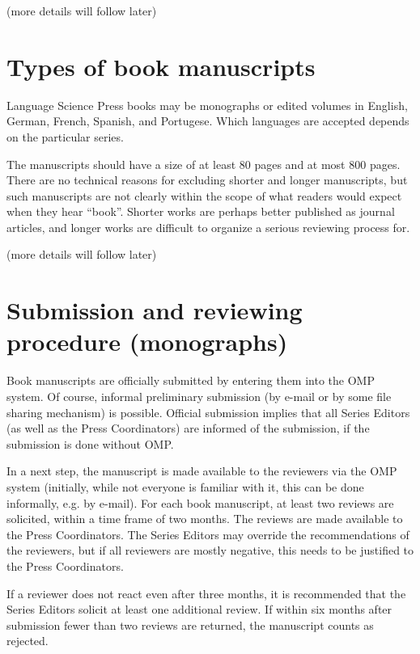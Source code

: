 \documentclass[ number=??
                ,series=lnls,
                ,isbn=000-0-000000-00-0,
                ,url=http://langsci-press.org/catalog/book/0,
	        ,output=long    %
	        ,draftmode  
		  ]{LSP/langsci}
\begin{document}
(more details will follow later)

\section{Types of book manuscripts}

Language Science Press books may be monographs or edited volumes in English, German, French, Spanish,
and Portugese. Which languages are accepted depends on the particular series.

The manuscripts should have a size of at least 80 pages and at most 800 pages.
There are no technical reasons for excluding shorter and longer manuscripts, but such manuscripts
are not clearly within the scope of what readers would expect when they hear ``book''. Shorter works
are perhaps better published as journal articles, and longer works are difficult to organize a
serious reviewing process for.

(more details will follow later)


\section{Submission and reviewing procedure (monographs)}

Book manuscripts are officially submitted by entering them into the OMP system. Of course,
informal preliminary submission (by e-mail or by some file sharing mechanism) is
possible. Official submission implies that all Series Editors (as well as the Press Coordinators)
are informed of the submission, if the submission is done without OMP.


In a next step, the manuscript is made available to the reviewers via the OMP system (initially,
while not everyone is familiar with it, this can be done informally, e.g. by e-mail). For each book
manuscript, at least two reviews are solicited, within a time frame of two months. The reviews are
made available to the Press Coordinators. The Series Editors may override the recommendations of the
reviewers, but if all reviewers are mostly negative, this needs to be justified to the Press
Coordinators.

If a reviewer does not react even after three months, it is recommended that the Series Editors
solicit at least one additional review. If within six months after submission fewer than two reviews
are returned, the manuscript counts as rejected.
\end{document}
